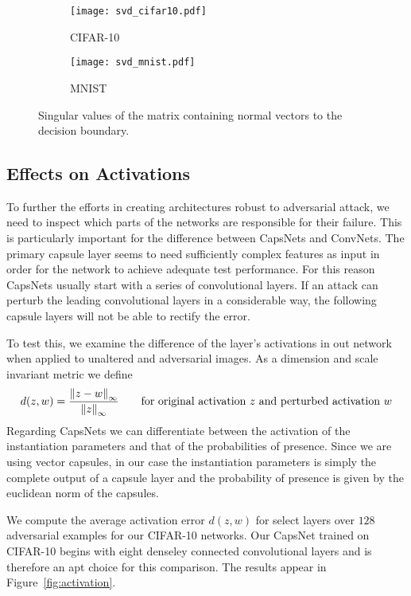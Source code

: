 \begin{figure}
	\centering
	\begin{subfigure}{\textwidth}
		\texttt{[image: svd\_cifar10.pdf]}
		\caption{CIFAR-10}
	\end{subfigure}
	\begin{subfigure}{\textwidth}
		\texttt{[image: svd\_mnist.pdf]}
		\caption{MNIST}
	\end{subfigure}
	
	\caption{Singular values of the matrix containing normal vectors to the decision boundary.}
	\label{fig:svd}
\end{figure}

\subsection{Effects on Activations}

To further the efforts in creating architectures robust to adversarial attack, we need to inspect which parts of the networks are responsible for their failure.
This is particularly important for the difference between CapsNets and ConvNets.
The primary capsule layer seems to need sufficiently complex features as input in order for the network to achieve adequate test performance.
For this reason CapsNets usually start with a series of convolutional layers.
If an attack can perturb the leading convolutional layers in a considerable way, the following capsule layers will not be able to rectify the error.

To test this, we examine the difference of the layer's activations in out network when applied to unaltered and adversarial images. As a dimension and scale invariant metric we define
\begin{equation}
	d(z, w) = \frac{\norm[\infty]{z - w}}{\norm[\infty]{z}}
	\qquad \text{for original activation $z$ and perturbed activation $w$}
\end{equation}
Regarding CapsNets we can differentiate between the activation of the instantiation parameters and that of the probabilities of presence. Since we are using vector capsules, in our case the instantiation parameters is simply the complete output of a capsule layer and the probability of presence is given by the euclidean norm of the capsules.

We compute the average activation error $d(z, w)$ for select layers over $128$ adversarial examples for our CIFAR-10 networks. Our CapsNet trained on CIFAR-10 begins with eight denseley connected convolutional layers and is therefore an apt choice for this comparison.
The results appear in Figure~\ref{fig:activation}.

